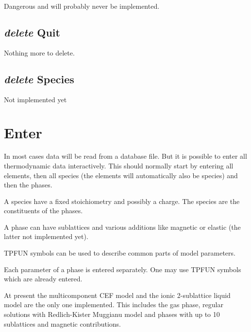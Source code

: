 \documentclass[12pt]{article}
\begin{document}
Dangerous and will probably never be implemented.

\subsection{{\em delete} Quit}

Nothing more to delete.

\subsection{{\em delete} Species}

Not implemented yet

\section{Enter }

In most cases data will be read from a database file.  But it is
possible to enter all thermodynamic data interactively.  This should
normally start by entering all elements, then all species (the
elements will automatically also be species) and then the phases.

A species have a fixed stoichiometry and possibly a charge.  The
species are the constituents of the phases.

A phase can have sublattices and various additions like magnetic or
elastic (the latter not implemented yet).  

TPFUN symbols can be used to describe common parts of model
parameters.

Each parameter of a phase is entered separately.  One may use
TPFUN symbols which are already entered.

At present the multicomponent CEF model and the ionic 2-sublattice
liquid model are the only one implemented.  This includes the gas
phase, regular solutions with Redlich-Kister Muggianu model and phases
with up to 10 sublattices and magnetic contributions.
\end{document}
